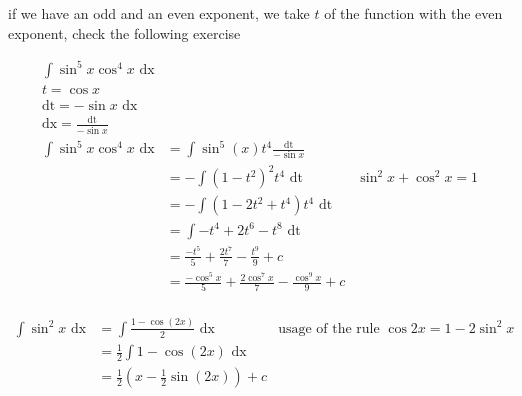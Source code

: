 \documentclass[a4paper,12pt]{article}
\newcommand{\?}{\stackrel{?}{=}}
\begin{document}
\begin{definition}
\begin{my_example}
\begin{note}
if we have an odd and an even exponent, we take \(t\) of the function with the even exponent, check the following exercise\\[0pt]
\end{note}
\begin{align*}
  \int \sin^5{x} \cos^4{x} \text{ dx}\\
  t = \cos x\\
  \text{dt} = -\sin x \text{ dx}\\
  \text{dx} = \frac{\text{dt}}{-\sin x}\\
  \int \sin^5{x} \cos^4{x} \text{ dx} &= \int \sin^5(x) t^4 \frac{\text{dt}}{-\sin x}\\
  &= -\int {(1-t^2)}^2 t^4 \text{ dt} &\sin^2{x} + \cos^2{x} = 1\\
  &= -\int (1-2t^2+t^4) t^4 \text{ dt}\\
  &= \int -t^4 + 2t^6 - t^8 \text{ dt}\\
  &= \frac{-t^5}{5} + \frac{2t^7}{7} - \frac{t^9}{9} + c\\
  &= \frac{-\cos^5{x}}{5} + \frac{2\cos^7 x}{7} - \frac{\cos^9 x}{9} + c\\
\end{align*}
\end{my_example}

\begin{my_example}
\begin{align*}
  \int \sin^2 x \text{ dx} &= \int \frac{1 - \cos(2x)}{2} \text{ dx} &\text{usage of the rule } \cos 2x = 1 - 2\sin^2 x\\
  &= \frac12 \int 1 - \cos(2x) \text{ dx}\\
  &= \frac12 \left(x - \frac12 \sin(2x)\right) + c
\end{align*}
\end{my_example}


\end{definition}
\end{document}
